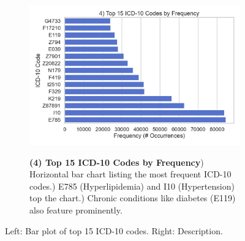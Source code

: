 \begin{figure}[ht!]
    \centering
    \begin{subfigure}{0.42\textwidth}
        \includegraphics[width=\linewidth]{mimic_plots/plot4.jpg}
    \end{subfigure}\hfill
    \begin{subfigure}{0.54\textwidth}
        \footnotesize
        \textbf{(4) Top 15 ICD-10 Codes by Frequency}) Horizontal bar chart listing the most frequent ICD-10 codes.) E785 (Hyperlipidemia) and I10 (Hypertension) top the chart.) Chronic conditions like diabetes (E119) also feature prominently.
    \end{subfigure}
    \caption{Left: Bar plot of top 15 ICD-10 codes. Right: Description.}
    \label{fig:plot4}
\end{figure}

